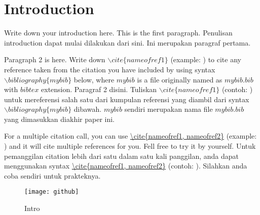 \chapter{Introduction}
\label{chap:intro}

\hspace{0.7cm}
Write down your introduction here. This is the first paragraph. Penulisan introduction dapat mulai dilakukan dari sini. Ini merupakan paragraf pertama.

\vfill
Paragraph 2 is here. Write down $\backslash cite\{nameofref1\}$ (example: \cite{nameofref1}) to cite any reference taken from the citation you have included by using syntax $\backslash bibliography\{mybib\}$ below, where $mybib$ is a file originally named as $mybib.bib$ with $bibtex$ extension. Paragraf 2 disini. Tuliskan $\backslash cite\{nameofref1\}$ (contoh: \cite{nameofref1}) untuk mereferensi salah satu dari kumpulan referensi yang diambil dari syntax $\backslash bibliography\{mybib\}$ dibawah. $mybib$ sendiri merupakan nama file $mybib.bib$ yang dimasukkan diakhir paper ini. 

\vfill
For a multiple citation call, you can use \url{\cite{nameofref1, nameofref2}} (example: \cite{nameofref1, nameofref2}) and it will cite multiple references for you. Fell free to try it by yourself. Untuk pemanggilan citation lebih dari satu dalam satu kali panggilan, anda dapat menggunakan syntax \url{\cite{nameofref1, nameofref2}} (contoh: \cite{nameofref1, nameofref2}). Silahkan anda coba sendiri untuk prakteknya.

%
%

\begin{figure}[H]
\centering
\texttt{[image: github]}
\caption{Intro}
\label{fig:fig1a}
\end{figure}

